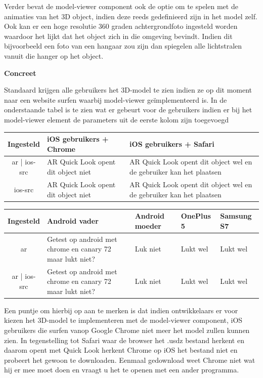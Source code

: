 Verder bevat de model-viewer component ook de optie om te spelen met de animaties van het 3D object, indien deze reeds gedefinieerd zijn in het model zelf. Ook kan er een hoge resolutie 360 graden achtergrondfoto ingesteld worden waardoor het lijkt dat het object zich in die omgeving bevindt. Indien dit bijvoorbeeld een foto van een hangaar zou zijn dan spiegelen alle lichtstralen vanuit die hanger op het object. 

\textbf{Concreet}

Standaard krijgen alle gebruikers het 3D-model te zien indien ze op dit moment naar een website surfen waarbij model-viewer geïmplementeerd is. In de onderstaande tabel is te zien wat er gebeurt voor de gebruikers indien er bij het model-viewer element de parameters uit de eerste kolom zijn toegevoegd

\begin{center}
	\begin{tabular}{| c | p{4.8cm} | p{4.8cm} |}
		\hline
		Ingesteld & iOS gebruikers + Chrome & iOS gebruikers + Safari \\ \hline 
		ar | ios-src & AR Quick Look opent dit object niet & AR Quick Look opent dit object wel en de gebruiker kan het plaatsen  \\ \hline
		ios-src & AR Quick Look opent dit object niet & AR Quick Look opent dit object wel en de gebruiker kan het plaatsen \\ \hline
		
	\end{tabular}
\end{center}

\begin{center}
	\begin{tabular}{| c | p{2.35cm} | p{2.35cm} | p{2.35cm} | p{2.35cm} |}
		\hline
		Ingesteld & Android vader & Android moeder & OnePlus 5 & Samsung S7 \\ \hline 
		ar & Getest op android met chrome en canary 72 maar lukt niet? & Luk niet  & Lukt wel & Lukt wel  \\ \hline
		ar | ios-src & Getest op android met chrome en canary 72 maar lukt niet? & Luk niet  & Lukt wel & Lukt wel \\ \hline
		
	\end{tabular}
\end{center}


Een puntje om hierbij op aan te merken is dat indien ontwikkelaars er voor kiezen het 3D-model te implementeren met de model-viewer component, iOS gebruikers die surfen vanop Google Chrome niet meer het model zullen kunnen zien. In tegenstelling tot Safari waar de browser het .usdz bestand herkent en daarom opent met Quick Look herkent Chrome op iOS het bestand niet en probeert het gewoon te downloaden. Eenmaal gedownload weet Chrome niet wat hij er mee moet doen en vraagt u het te openen met een ander programma. 

